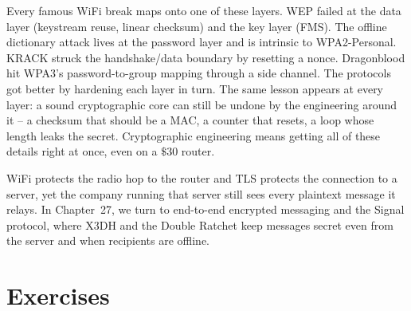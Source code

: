 \begin{center}
\end{center}

Every famous WiFi break maps onto one of these layers. WEP failed at the data
layer (keystream reuse, linear checksum) and the key layer (FMS). The offline
dictionary attack lives at the password layer and is intrinsic to WPA2-Personal.
KRACK struck the handshake/data boundary by resetting a nonce. Dragonblood hit
WPA3's password-to-group mapping through a side channel. The protocols got better
by hardening each layer in turn. The same lesson appears at every layer: a sound
cryptographic core can still be undone by the engineering around it -- a
checksum that should be a MAC, a counter that resets, a loop whose length leaks the
secret. Cryptographic engineering means getting all of these details right at once,
even on a $\$30$ router.

WiFi protects the radio hop to the router and TLS protects the connection to a server,
yet the company running that server still sees every plaintext message it relays. In
Chapter~27, we turn to end-to-end encrypted messaging and the Signal protocol, where X3DH
and the Double Ratchet keep messages secret even from the server and when recipients are
offline.

\section{Exercises}

